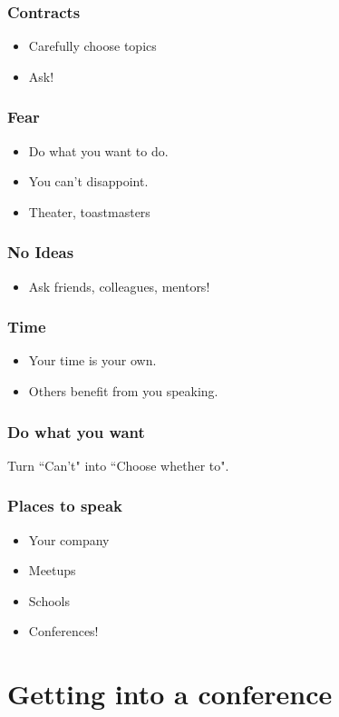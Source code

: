 \documentclass{beamer}
\begin{document}
\begin{frame}[fragile]
\frametitle{Contracts}
\begin{itemize}[<+(1)->]
\item Carefully choose topics
\item Ask!
\end{itemize}
\end{frame}

\begin{frame}[fragile]
\frametitle{Fear}
\begin{itemize}[<+(1)->]
\item Do what you want to do.
\item You can't disappoint.
\item Theater, toastmasters
\end{itemize}
\end{frame}

\begin{frame}[fragile]
\frametitle{No Ideas}
\begin{itemize}[<+(1)->]
\item Ask friends, colleagues, mentors!
\end{itemize}
\end{frame}

\begin{frame}[fragile]
\frametitle{Time}
\begin{itemize}[<+(1)->]
\item Your time is your own.
\item Others benefit from you speaking.
\end{itemize}
\end{frame}

\begin{frame}[fragile]
\frametitle{Do what you want}
Turn ``Can't" into ``Choose whether to".
\end{frame}

\begin{frame}[fragile]
\frametitle{Places to speak}
\begin{itemize}[<+(1)->]
\item Your company
\item Meetups
\item Schools
\item Conferences!
\end{itemize}
\end{frame}

\section{Getting into a conference}
\end{document}
